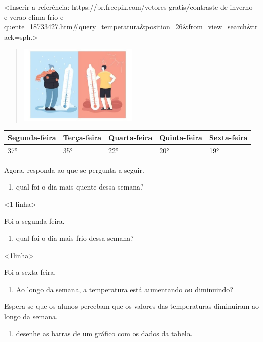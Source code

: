 \textless{}Inserir a referência:
https://br.freepik.com/vetores-gratis/contraste-de-inverno-e-verao-clima-frio-e-quente\_18733427.htm\#query=temperatura\&position=26\&from\_view=search\&track=sph.\textgreater{}

\begin{quote}
\includegraphics[width=2.20878in,height=1.47139in]{media/image104.jpg}
\end{quote}

\begin{longtable}[]{@{}lllll@{}}
\toprule
Segunda-feira & Terça-feira & Quarta-feira & Quinta-feira & Sexta-feira\tabularnewline
\midrule
\endhead
37° & 35° & 22° & 20° & 19°\tabularnewline
\bottomrule
\end{longtable}

Agora, responda ao que se pergunta a seguir.

\begin{enumerate}
\def\labelenumi{\Alph{enumi})}
\item
  qual foi o dia mais quente dessa semana?
\end{enumerate}

\textless{}1 linha\textgreater{}

Foi a segunda-feira.

\begin{enumerate}
\def\labelenumi{\Alph{enumi})}
\item
  qual foi o dia mais frio dessa semana?
\end{enumerate}

\textless{}1linha\textgreater{}

Foi a sexta-feira.

\begin{enumerate}
\def\labelenumi{\Alph{enumi})}
\item
  Ao longo da semana, a temperatura está aumentando ou diminuindo?
\end{enumerate}

Espera-se que os alunos percebam que os valores das temperaturas diminuíram ao longo da semana.

\begin{enumerate}
\def\labelenumi{\Alph{enumi})}
\item
  desenhe as barras de um gráfico com os dados da tabela.
\end{enumerate}

